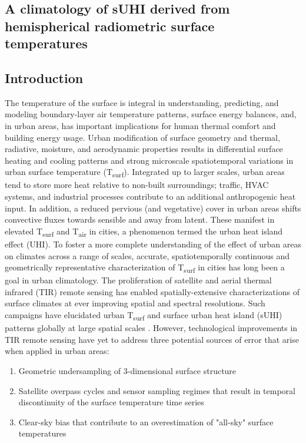 \begin{bibunit}

\rhead{\thepage}

\chapter{A climatology of sUHI derived from hemispherical radiometric surface temperatures}
\label{paper2}

\section{Introduction}

The temperature of the surface is integral in understanding, predicting, and modeling boundary-layer air temperature patterns, surface energy balances, and, in urban areas, has important implications for human thermal comfort and building energy usage. Urban modification of surface geometry and thermal, radiative, moisture, and aerodynamic properties results in differential surface heating and cooling patterns and strong microscale spatiotemporal variations in urban surface temperature (T\textsubscript{surf}). Integrated up to larger scales, urban areas tend to store more heat relative to non-built surroundings; traffic, HVAC systems, and industrial processes contribute to an additional anthropogenic heat input. In addition, a reduced pervious (and vegetative) cover in urban areas shifts convective fluxes towards sensible and away from latent. These manifest in elevated T\textsubscript{surf} and T\textsubscript{air} in cities, a phenomenon termed the urban heat island effect (UHI). To foster a more complete understanding of the effect of urban areas on climates across a range of scales, accurate, spatiotemporally continuous and geometrically representative characterization of T\textsubscript{surf} in cities has long been a goal in urban climatology. The proliferation of satellite and aerial thermal infrared (TIR) remote sensing has enabled spatially-extensive characterizations of surface climates at ever improving spatial and spectral resolutions. Such campaigns have elucidated urban T\textsubscript{surf} and surface urban heat island (sUHI) patterns globally at large spatial scales \cite{Peng2012,Zhao2014}. However, technological improvements in TIR remote sensing have yet to address three potential sources of error that arise when applied in urban areas: 

\begin{enumerate}
	\item Geometric undersampling of 3-dimensional surface structure
	\item Satellite overpass cycles and sensor sampling regimes that result in temporal discontinuity of the surface temperature time series
	\item Clear-sky bias that contribute to an overestimation of "all-sky" surface temperatures
\end{enumerate}


\end{bibunit}
